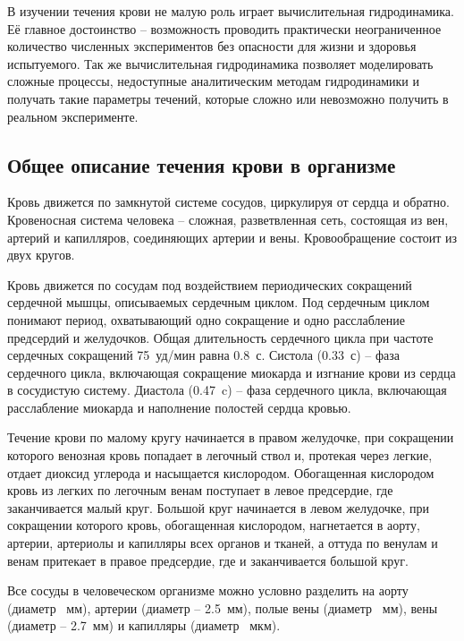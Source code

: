 В изучении течения крови не малую роль играет вычислительная гидродинамика. Её главное достоинство -- возможность проводить практически 
неограниченное количество численных экспериментов без опасности для жизни и здоровья испытуемого. Так же вычислительная гидродинамика 
позволяет моделировать сложные процессы, недоступные аналитическим методам гидродинамики и получать такие параметры течений, которые 
сложно или невозможно получить в реальном эксперименте.

\subsection{Общее описание течения крови в организме}
Кровь движется по замкнутой системе сосудов, циркулируя от сердца и обратно. Кровеносная система человека -- сложная, разветвленная сеть,
 состоящая из вен, артерий и капилляров, соединяющих артерии и вены. Кровообращение состоит из двух кругов.

Кровь движется по сосудам под воздействием периодических сокращений сердечной мышцы, описываемых сердечным циклом. 
Под сердечным циклом понимают период, охватывающий одно сокращение и одно расслабление предсердий и желудочков. 
Общая длительность сердечного цикла при частоте сердечных сокращений 75~уд/мин равна 0.8~с. Систола (0.33~с) -- фаза сердечного цикла, 
включающая сокращение миокарда и изгнание крови из сердца в сосудистую систему. Диастола (0.47~c) -- фаза сердечного цикла, 
включающая расслабление миокарда и наполнение полостей сердца кровью.

Течение крови по малому кругу начинается в правом желудочке, при сокращении которого венозная кровь попадает в легочный ствол и, 
протекая через легкие, отдает диоксид углерода и насыщается кислородом. Обогащенная кислородом кровь из легких по легочным венам 
поступает в левое предсердие, где заканчивается малый круг. Большой круг начинается в левом желудочке, при сокращении которого кровь, 
обогащенная кислородом, нагнетается в аорту, артерии, артериолы и капилляры всех органов и тканей, а оттуда по венулам и венам 
притекает в правое предсердие, где и заканчивается большой круг.

Все сосуды в человеческом организме можно условно разделить на аорту (диаметр ~мм), артерии (диаметр  -- 2.5~мм), 
полые вены (диаметр ~мм), вены (диаметр  -- 2.7~мм) и капилляры (диаметр ~мкм).

